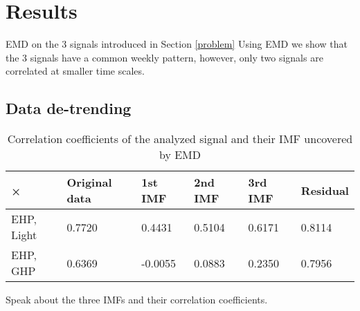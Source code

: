 \section{Results}
EMD on the 3 signals introduced in Section \ref{problem}
Using EMD we show that the 3 signals have a common weekly pattern, however, only two signals are correlated at smaller time scales.

\subsection{Data de-trending}
\begin{table*}
\begin{center}
\begin{tabular}{|l|l|l|l|l|l|}
\hline
× & Original data & 1st IMF & 2nd IMF & 3rd IMF & Residual\\ \hline
EHP, Light & 0.7720 & 0.4431 & 0.5104 & 0.6171 & 0.8114\\ \hline
EHP, GHP & 0.6369 & -0.0055 & 0.0883 & 0.2350 & 0.7956\\ \hline
\end{tabular}

\caption{Correlation coefficients of the analyzed signal and their IMF uncovered by EMD}

\end{center}
\end{table*}

Speak about the three IMFs and their correlation coefficients.